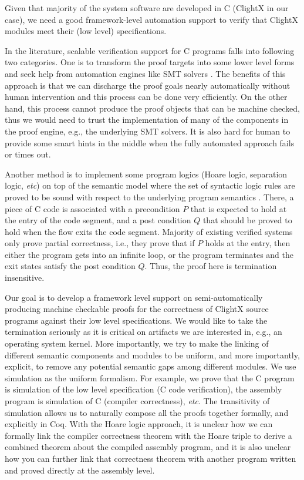 Given that majority of the system software are developed in C (ClightX
in our case), we need a good framework-level automation support to
verify that ClightX modules meet their (low level) specifications. 

In the literature, scalable verification support for C programs falls into following two
categories. One is to transform the proof targets into some lower
level forms and seek help from automation engines like SMT solvers
\cite{boogie05,dafny10}.
The benefits of this approach is that we can discharge the proof goals
nearly automatically without human intervention and this process can be done
very efficiently. On the other hand, this process cannot produce the proof
objects that can be machine checked, thus we would need to trust the implementation
of many of the components in the proof engine, e.g., the underlying SMT solvers.
It is also hard for human to provide some smart hints in the middle when the
fully automated approach fails or times out.

Another method is to implement some program logics
(Hoare logic, separation logic, {\it etc}) on top of the semantic model where the
set of syntactic logic rules are proved to be sound with respect to the underlying
program semantics \cite{appel11:vst}. There, a piece of C code
is associated with a precondition $P$ that is expected to hold at the entry of
the code segment, and a post condition $Q$ that should be proved to hold when
the flow exits the code segment. Majority of existing verified systems only prove
partial correctness, i.e., they prove that if $P$ holds at the entry, then either
the program gets into an infinite loop, or the program terminates and the exit states
satisfy the post condition $Q$. Thus, the proof here is termination insensitive.

Our goal is to develop a framework level support on semi-automatically
producing machine checkable proofs for the correctness of ClightX source programs
against their low level specifications.
We would like to take the termination seriously as it is critical on artifacts
we are interested in, e.g., an operating system kernel.
More importantly, we try to make
the linking of different semantic components and modules to be uniform, and more importantly,
explicit, to remove any potential semantic gaps among different modules.
We use simulation as the uniform formalism. For example, we prove that
the C program is simulation of the low level specification (C code verification), 
the assembly program is simulation of C (compiler correctness), {\it etc}.
The transitivity of simulation allows us to naturally compose all the
proofs together formally, and explicitly in Coq.
With the Hoare logic approach, it is unclear how we can formally link the compiler
correctness theorem with the Hoare triple to derive a combined theorem about
the compiled assembly program, and it is also unclear how you can further link
that correctness theorem with another program written and proved directly
at the assembly level.

